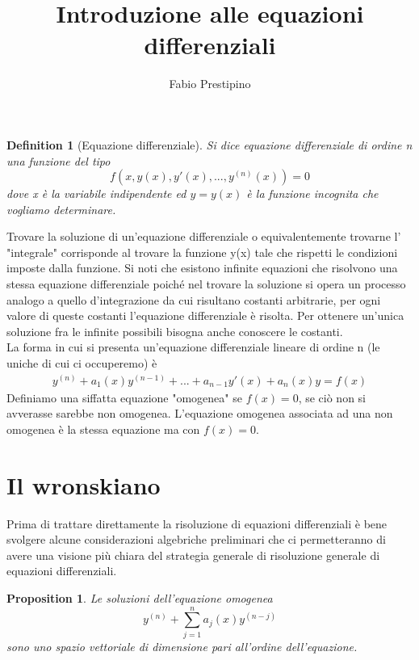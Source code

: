 \documentclass[10pt,a4paper]{article}
\author{Fabio Prestipino}
\title{Introduzione alle equazioni differenziali}
\newtheorem{definition}{Definition}
\newtheorem{prop}{Proposition}
\begin{document}
	\maketitle
\begin{definition}[Equazione differenziale]
	Si dice equazione differenziale di ordine n una funzione del tipo
	\[f(x, y(x),y'(x),..., y^{(n)}(x)) = 0\]
	dove x è la variabile indipendente ed \(y = y(x)\) è la funzione incognita che vogliamo determinare. 
\end{definition}
Trovare la soluzione di un'equazione differenziale o equivalentemente trovarne l' "integrale" corrisponde al trovare la funzione y(x) tale che rispetti le condizioni imposte dalla funzione. Si noti che esistono infinite equazioni che risolvono una stessa equazione differenziale poiché nel trovare la soluzione si opera un processo analogo a quello d'integrazione da cui risultano costanti arbitrarie, per ogni valore di queste costanti l'equazione differenziale è risolta. Per ottenere un'unica soluzione fra le infinite possibili bisogna anche conoscere le costanti.\\
La forma in cui si presenta un'equazione differenziale lineare di ordine n (le uniche di cui ci occuperemo) è
\begin{align*}
	y^{(n)} + a_1(x)y^{(n-1)} +...+ a_{n-1} y'(x) + a_n(x)y = f(x)
\end{align*}   
Definiamo una siffatta equazione "omogenea" se \(f(x)=0\), se ciò non si avverasse sarebbe non omogenea. L'equazione omogenea associata ad una non omogenea è la stessa equazione ma con \(f(x) = 0 \). 

\section{Il wronskiano}
Prima di trattare direttamente la risoluzione di equazioni differenziali è bene svolgere alcune considerazioni algebriche preliminari che ci permetteranno di avere una visione più chiara del strategia generale di risoluzione generale di equazioni differenziali.
\begin{prop}
	Le soluzioni dell'equazione omogenea 
	\[y^{(n)}+ \sum_{j = 1}^{n}a_j(x)y^{(n-j)}\]
	sono uno spazio vettoriale di dimensione pari all'ordine dell'equazione. 
\end{prop}
\end{document}
